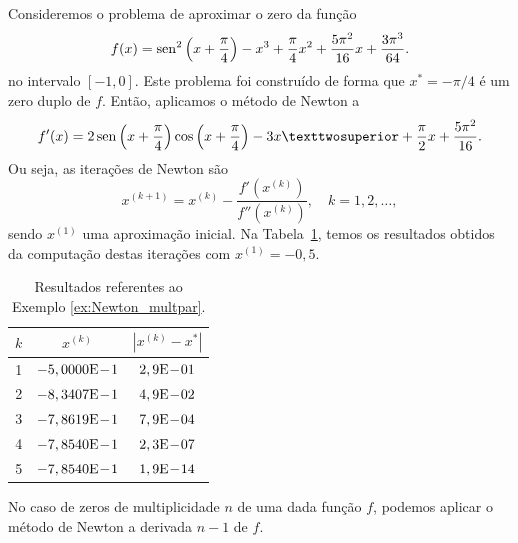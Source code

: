 \begin{ex}\label{ex:Newton_multpar}
  Consideremos o problema de aproximar o zero da função
  \begin{equation}
    f(x) = \operatorname{sen}^2\left(x+\frac{\pi}{4}\right) - x^3 + \frac{\pi}{4}x^2 + \frac{5\pi^2}{16}x + \frac{3\pi^3}{64}.
  \end{equation}
  no intervalo $[-1,0]$. Este problema foi construído de forma que $x^* = -\pi/4$ é um zero duplo de $f$. Então, aplicamos o método de Newton a
  \begin{equation}
    f'(x) = 2\sen\left(x+\frac{\pi}{4}\right)\cos\left(x+\frac{\pi}{4}\right) -3x² +\frac{\pi}{2}x+\frac{5\pi^2}{16}.
  \end{equation}
Ou seja, as iterações de Newton são
\begin{equation}
  x^{(k+1)} = x^{(k)} - \frac{f'(x^{(k)})}{f''(x^{(k)})},\quad k=1,2,\ldots,
\end{equation}
sendo $x^{(1)}$ uma aproximação inicial. Na Tabela~\ref{tab:ex_Newton_multpar}, temos os resultados obtidos da computação destas iterações com $x^{(1)}=-0,5$.

\begin{table}[h!]
  \centering
  \caption{Resultados referentes ao Exemplo \ref{ex:Newton_multpar}.}
  \label{tab:ex_Newton_multpar}
  \begin{tabular}{r|cc}
    $k$ & $x^{(k)}$ & $|x^{(k)}-x^*|$ \\\hline
    1 & $-5,0000\mathrm{E}\!-\!1$ & $2,9\mathrm{E}\!-\!01$ \\
    2 & $-8,3407\mathrm{E}\!-\!1$ & $4,9\mathrm{E}\!-\!02$ \\
    3 & $-7,8619\mathrm{E}\!-\!1$ & $7,9\mathrm{E}\!-\!04$ \\
    4 & $-7,8540\mathrm{E}\!-\!1$ & $2,3\mathrm{E}\!-\!07$ \\
    5 & $-7,8540\mathrm{E}\!-\!1$ & $1,9\mathrm{E}\!-\!14$ \\\hline
  \end{tabular}
\end{table}

% 
\end{ex}

\begin{obs}
  No caso de zeros de multiplicidade $n$ de uma dada função $f$, podemos aplicar o método de Newton a derivada $n-1$ de $f$.
\end{obs}

